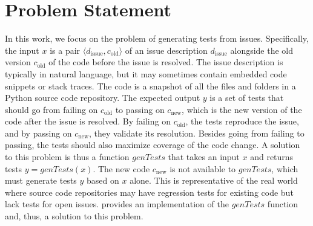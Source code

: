 \section{Problem Statement}\label{sec:problem}

In this work, we focus on the problem of generating tests from issues.
Specifically, the input $x$ is a pair
\mbox{$\langle d_\mathrm{issue},c_\mathrm{old}\rangle$}
of an issue description $d_\mathrm{issue}$ alongside the old version
$c_\mathrm{old}$ of the code before the issue is resolved.
The issue description is typically in natural language, but it may
sometimes contain embedded code snippets or stack traces.
The code is a snapshot of all the files and folders in a Python
source code repository.
The expected output $y$ is a set of tests that should go from failing
on $c_\mathrm{old}$ to passing on $c_\mathrm{new}$, which is the new
version of the code after the issue is resolved.
By failing on $c_\mathrm{old}$, the tests reproduce the issue, and by
passing on $c_\mathrm{new}$, they validate its resolution.
Besides going from failing to passing, the tests should also maximize
coverage of the code change. %
A solution to this problem is thus a function $\mathit{genTests}$ that
takes an input $x$ and returns tests \mbox{$y=\mathit{genTests}(x)$}.
The new code $c_\mathrm{new}$ is not available to $\mathit{genTests}$, which must
generate tests $y$ based on $x$ alone.
This is representative of the real world where source code
repositories may have regression tests for existing code but lack
tests for open issues.
\solx provides an implementation of the $\mathit{genTests}$ function
and, thus, a solution to this problem.

